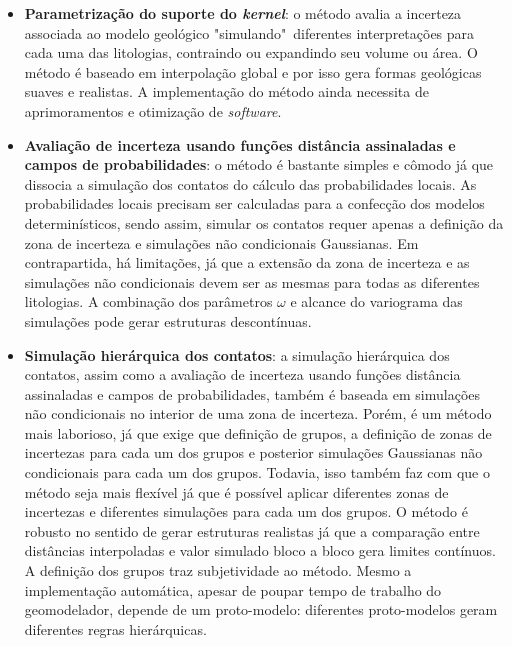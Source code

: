 \begin{itemize}
    \item \textbf{Parametrização do suporte do \textit{kernel}}: o método avalia a incerteza associada ao modelo geológico "simulando"\ diferentes interpretações para cada uma das litologias, contraindo ou expandindo seu volume ou área. O método é baseado em interpolação global e por isso gera formas geológicas suaves e realistas. A implementação do método ainda necessita de aprimoramentos e otimização de \textit{software}.
    \item \textbf{Avaliação de incerteza usando funções distância assinaladas e campos de probabilidades}: o método é bastante simples e cômodo já que dissocia a simulação dos contatos do cálculo das probabilidades locais. As probabilidades locais precisam ser calculadas para a confecção dos modelos determinísticos, sendo assim, simular os contatos requer apenas a definição da zona de incerteza e simulações não condicionais Gaussianas. Em contrapartida, há limitações, já que a extensão da zona de incerteza e as simulações não condicionais devem ser as mesmas para todas as diferentes litologias. A combinação dos parâmetros $\omega$ e alcance do variograma das simulações pode gerar estruturas descontínuas. 
    \item \textbf{Simulação hierárquica dos contatos}: a simulação hierárquica dos contatos, assim como a avaliação de incerteza usando funções distância assinaladas e campos de probabilidades, também é baseada em simulações não condicionais no interior de uma zona de incerteza. Porém, é um método mais laborioso, já que exige que definição de grupos, a definição de zonas de incertezas para cada um dos grupos e posterior simulações Gaussianas não condicionais para cada um dos grupos. Todavia, isso também faz com que o método seja mais flexível já que é possível aplicar diferentes zonas de incertezas e diferentes simulações para cada um dos grupos. O método é robusto no sentido de gerar estruturas realistas já que a comparação entre distâncias interpoladas e valor simulado bloco a bloco gera limites contínuos. A definição dos grupos traz subjetividade ao método. Mesmo a implementação automática, apesar de poupar tempo de trabalho do geomodelador, depende de um proto-modelo: diferentes proto-modelos geram diferentes regras hierárquicas.

\end{itemize}
